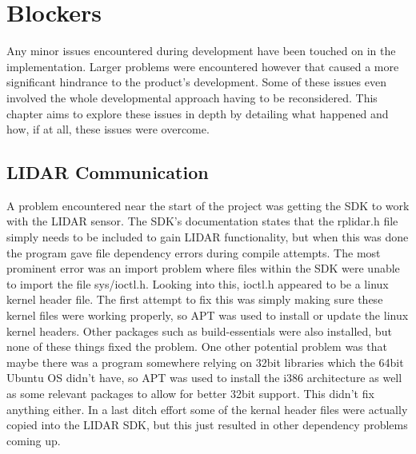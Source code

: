	\chapter{Blockers}
	Any minor issues encountered during development have been touched on in the implementation. Larger problems were encountered however that caused a more significant hindrance to the product's development. Some of these issues even involved the whole developmental approach having to be reconsidered. This chapter aims to explore these issues in depth by detailing what happened and how, if at all, these issues were overcome.
		
		\section{LIDAR Communication}
		A problem encountered near the start of the project was getting the SDK to work with the LIDAR sensor. The SDK's documentation states that the rplidar.h file simply needs to be included to gain LIDAR functionality, but when this was done the program gave file dependency errors during compile attempts. The most prominent error was an import problem where files within the SDK were unable to import the file sys/ioctl.h. Looking into this, ioctl.h appeared to be a linux kernel header file. The first attempt to fix this was simply making sure these kernel files were working properly, so APT was used to install or update the linux kernel headers. Other packages such as build-essentials were also installed, but none of these things fixed the problem. One other potential problem was that maybe there was a program somewhere relying on 32bit libraries which the 64bit Ubuntu OS didn't have, so APT was used to install the i386 architecture as well as some relevant packages to allow for better 32bit support. This didn't fix anything either. In a last ditch effort some of the kernal header files were actually copied into the LIDAR SDK, but this just resulted in other dependency problems coming up.
		
